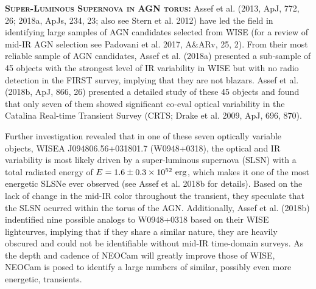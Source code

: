 \documentclass[12pt]{article}
\begin{document}
\smallskip
\smallskip
\noindent
\textbf{\textsc{Super-Luminous Supernova in AGN torus: }} 
Assef et al. (2013, ApJ, 772, 26; 2018a, ApJs, 234, 23; also see Stern et al. 2012) have led the field in identifying large samples of AGN candidates selected from WISE (for a review of mid-IR AGN selection see Padovani et al. 2017, A\&ARv, 25, 2). From their most reliable sample of AGN candidates, Assef et al. (2018a) presented a sub-sample of 45 objects with the strongest level of IR variability in WISE but with no radio detection in the FIRST survey, implying that they are not blazars. Assef et al. (2018b, ApJ, 866, 26) presented a detailed study of these 45 objects and found that only seven of them showed significant co-eval optical variability in the Catalina Real-time Transient Survey (CRTS; Drake et al. 2009, ApJ, 696, 870).

\smallskip
\smallskip
\noindent
Further investigation revealed that in one of these seven optically variable objects, WISEA J094806.56+031801.7 (W0948+0318), the optical and IR variability is most likely driven by a super-luminous supernova (SLSN) with a total radiated energy of $E=1.6\pm 0.3 \times 10^{52}~\rm erg$, which makes it one of the most energetic SLSNe ever observed (see Assef et al. 2018b for details). Based on the lack of change in the mid-IR color throughout the transient, they speculate that the SLSN ocurred within the torus of the AGN. Additionally, Assef et al. (2018b) indentified nine possible analogs to W0948+0318 based on their WISE lightcurves, implying that if they share a similar nature, they are heavily obscured and could not be identifiable without mid-IR time-domain surveys. As the depth and cadence of NEOCam will greatly improve those of WISE, NEOCam is posed to identify a large numbers of similar, possibly even more energetic, transients.
\end{document}
